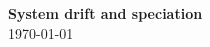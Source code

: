 \documentclass{article}
\newcommand{\1}{\mathbbm{1}}
\begin{document}
\linenumbers

{\centering
{\Huge \bf System drift and speciation} \\ \vspace{0.75cm}
\small \today \\
\vspace{0.25cm}
}

%
%
%
%
%
%
%
%
%
%
%
%
%
%
%
\end{document}
